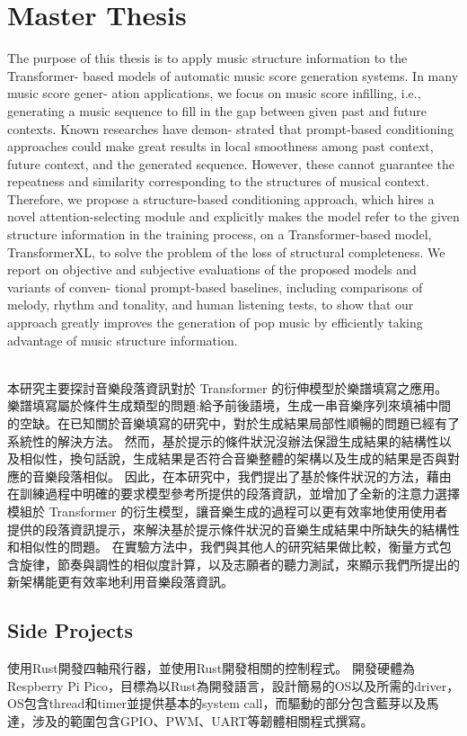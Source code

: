 \section{Master Thesis}
{The purpose of this thesis is to apply music structure information to the Transformer- based models of automatic music score generation systems. In many music score gener- ation applications, we focus on music score infilling, i.e., generating a music sequence to fill in the gap between given past and future contexts. Known researches have demon- strated that prompt-based conditioning approaches could make great results in local smoothness among past context, future context, and the generated sequence. However, these cannot guarantee the repeatness and similarity corresponding to the structures of musical context. Therefore, we propose a structure-based conditioning approach, which hires a novel attention-selecting module and explicitly makes the model refer to the given structure information in the training process, on a Transformer-based model, TransformerXL, to solve the problem of the loss of structural completeness. We report on objective and subjective evaluations of the proposed models and variants of conven- tional prompt-based baselines, including comparisons of melody, rhythm and tonality, and human listening tests, to show that our approach greatly improves the generation of pop music by efficiently taking advantage of music structure information.}
\\
\\
\begin{CJK}{UTF8}{bsmi}
{本研究主要探討音樂段落資訊對於 Transformer 的衍伸模型於樂譜填寫之應用。 樂譜填寫屬於條件生成類型的問題:給予前後語境，生成一串音樂序列來填補中間的空缺。在已知關於音樂填寫的研究中，對於生成結果局部性順暢的問題已經有了系統性的解決方法。 然而，基於提示的條件狀況沒辦法保證生成結果的結構性以及相似性，換句話說，生成結果是否符合音樂整體的架構以及生成的結果是否與對應的音樂段落相似。 因此，在本研究中，我們提出了基於條件狀況的方法，藉由在訓練過程中明確的要求模型參考所提供的段落資訊，並增加了全新的注意力選擇模組於 Transformer 的衍生模型，讓音樂生成的過程可以更有效率地使用使用者提供的段落資訊提示，來解決基於提示條件狀況的音樂生成結果中所缺失的結構性和相似性的問題。 在實驗方法中，我們與其他人的研究結果做比較，衡量方式包含旋律，節奏與調性的相似度計算，以及志願者的聽力測試，來顯示我們所提出的新架構能更有效率地利用音樂段落資訊。}
\end{CJK}

\begin{CJK}{UTF8}{bsmi}
\section{Side Projects}
{使用Rust開發四軸飛行器，並使用Rust開發相關的控制程式。
開發硬體為Respberry Pi Pico，目標為以Rust為開發語言，設計簡易的OS以及所需的driver，OS包含thread和timer並提供基本的system call，而驅動的部分包含藍芽以及馬達，涉及的範圍包含GPIO、PWM、UART等韌體相關程式撰寫。}
\end{CJK}